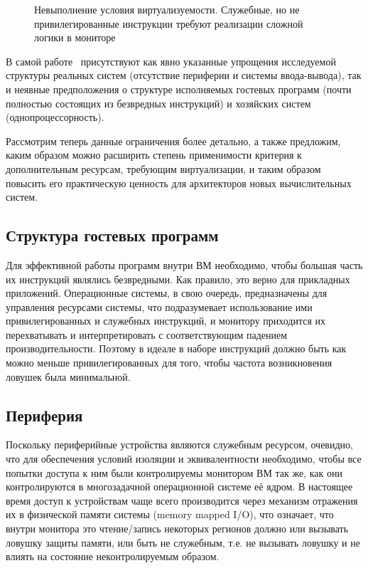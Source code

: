 \begin{figure}[htb]
    \centering
    \caption[Невыполнение условия виртуализуемости]{Невыполнение условия виртуализуемости. Служебные, но не привилегированные инструкции требуют реализации сложной логики в мониторе}
    \label{fig:vm-bad-condition}
\end{figure}

В самой работе~\cite{popek} присутствуют как явно указанные упрощения исследуемой структуры реальных систем (отсутствие периферии и системы ввода-вывода), так и неявные предположения о структуре исполняемых гостевых программ (почти полностью состоящих из безвредных инструкций) и хозяйских систем (однопроцессорность).

Рассмотрим теперь данные ограничения более детально, а также предложим, каким образом можно расширить степень применимости критерия к дополнительным ресурсам, требующим виртуализации, и таким образом повысить его практическую ценность для архитекторов новых вычислительных систем.

\subsection{Структура гостевых программ}

Для эффективной работы программ внутри ВМ необходимо, чтобы большая часть их инструкций являлись безвредными. Как правило, это верно для прикладных приложений. Операционные системы, в свою очередь, предназначены для управления ресурсами системы, что подразумевает использование ими привилегированных и служебных инструкций, и монитору приходится их перехватывать и интерпретировать с соответствующим падением производительности. Поэтому в идеале в наборе инструкций должно быть как можно меньше привилегированных для того, чтобы частота возникновения ловушек была минимальной.

\subsection{Периферия}

Поскольку периферийные устройства являются служебным ресурсом, очевидно, что для обеспечения условий изоляции и эквивалентности необходимо, чтобы все попытки доступа к ним были контролируемы монитором ВМ так же, как они контролируются в многозадачной операционной системе её ядром. В настоящее время доступ к устройствам чаще всего производится через механизм отражения их в физической памяти системы (\abbr memory mapped I/O), что означает, что внутри монитора это чтение/запись некоторых регионов должно или вызывать ловушку защиты памяти, или быть не служебным, т.е. не вызывать ловушку и не влиять на состояние неконтролируемым образом.

